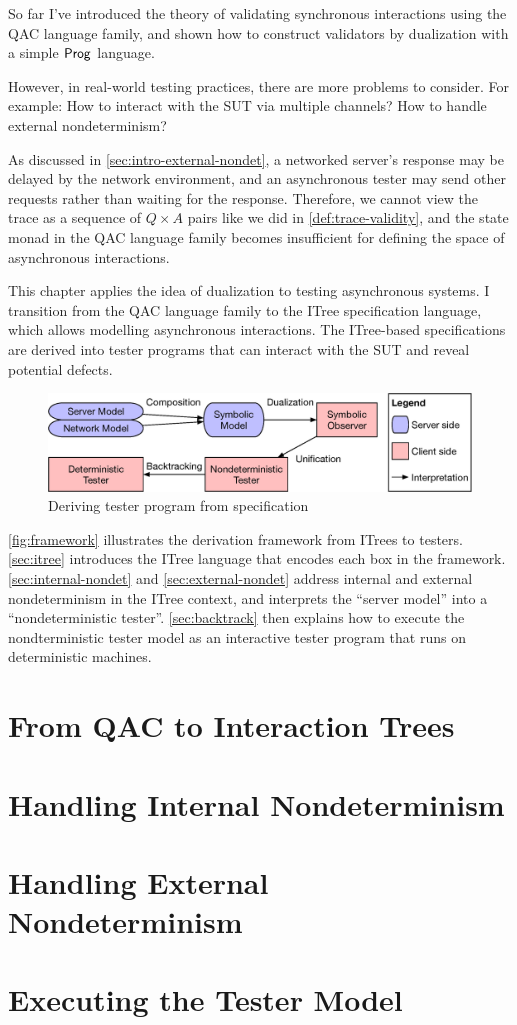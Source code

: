 So far I've introduced the theory of validating synchronous interactions using
the QAC language family, and shown how to construct validators by dualization
with a simple $\mathsf{Prog}$ language.

However, in real-world testing practices, there are more problems to consider.
For example: How to interact with the SUT via multiple channels?  How to handle
external nondeterminism?

As discussed in \autoref{sec:intro-external-nondet}, a networked server's
response may be delayed by the network environment, and an asynchronous tester
may send other requests rather than waiting for the response.  Therefore, we
cannot view the trace as a sequence of $Q\times A$ pairs like we did
in \autoref{def:trace-validity}, and the state monad in the QAC language family
becomes insufficient for defining the space of asynchronous interactions.

This chapter applies the idea of dualization to testing asynchronous systems.  I
transition from the QAC language family to the ITree specification language,
which allows modelling asynchronous interactions.  The ITree-based
specifications are derived into tester programs that can interact with the SUT
and reveal potential defects.

\begin{figure}
  \includegraphics[width=\linewidth]{figures/framework}
  \caption{Deriving tester program from specification}
  \label{fig:framework}
\end{figure}

\autoref{fig:framework} illustrates the derivation framework from ITrees to
testers.  \autoref{sec:itree} introduces the ITree language that encodes each
box in the framework.  \autoref{sec:internal-nondet} and
\autoref{sec:external-nondet} address internal and external nondeterminism in
the ITree context, and interprets the ``server model'' into a ``nondeterministic
tester''.  \autoref{sec:backtrack} then explains how to execute the
nondterministic tester model as an interactive tester program that runs on
deterministic machines.

\section{From QAC to Interaction Trees}
\label{sec:itree}


\section{Handling Internal Nondeterminism}
\label{sec:internal-nondet}


\section{Handling External Nondeterminism}
\label{sec:external-nondet}


\section{Executing the Tester Model}
\label{sec:backtrack}

